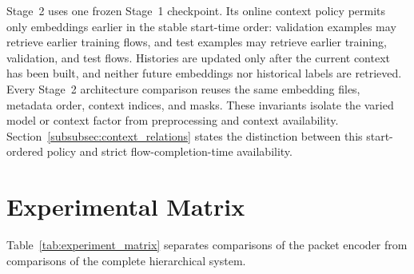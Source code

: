 \documentclass[11pt,fleqn]{report}
\begin{document}
Stage~2 uses one frozen Stage~1 checkpoint. Its online context policy permits only embeddings earlier in the stable start-time order: validation examples may retrieve earlier training flows, and test examples may retrieve earlier training, validation, and test flows. Histories are updated only after the current context has been built, and neither future embeddings nor historical labels are retrieved. Every Stage~2 architecture comparison reuses the same embedding files, metadata order, context indices, and masks. These invariants isolate the varied model or context factor from preprocessing and context availability. Section~\ref{subsubsec:context_relations} states the distinction between this start-ordered policy and strict flow-completion-time availability.

\section{Experimental Matrix}
\label{subsec:experimental_matrix}

Table~\ref{tab:experiment_matrix} separates comparisons of the packet encoder from comparisons of the complete hierarchical system.

\begin{table}[H]
    \centering
    \caption{Experimental matrix. Only the factor listed in the final column is changed within each experiment group.}
    \label{tab:experiment_matrix}
\end{table}
\end{document}
